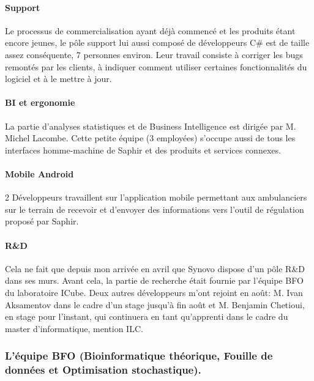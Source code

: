 \documentclass[french, 11pt]{memoir}
\begin{document}
\paragraph{Support}\label{support}

Le processus de commercialisation ayant déjà commencé et les produits
étant encore jeunes, le pôle support lui aussi composé de développeurs
C\# est de taille assez conséquente, 7 personnes environ. Leur travail
consiste à corriger les bugs remontés par les clients, à indiquer
comment utiliser certaines fonctionnalités du logiciel et à le mettre à
jour.

\paragraph{BI et ergonomie}\label{bi-et-ergonomie}

La partie d'analyses statistiques et de Business Intelligence est
dirigée par M. Michel Lacombe. Cette petite équipe (3 employées)
s'occupe aussi de tous les interfaces homme-machine de Saphir et des
produits et services connexes.

\paragraph{Mobile Android}\label{mobile-android}

2 Développeurs travaillent sur l'application mobile permettant aux
ambulanciers sur le terrain de recevoir et d'envoyer des informations
vers l'outil de régulation proposé par Saphir.

\paragraph{R\&D}\label{rd}

Cela ne fait que depuis mon arrivée en avril que Synovo dispose d'un
pôle R\&D dans ses murs. Avant cela, la partie de recherche était
fournie par l'équipe BFO du laboratoire ICube. Deux autres développeurs
m'ont rejoint en août: M. Ivan Aksamentov dans le cadre d'un stage
jusqu'à fin août et M. Benjamin Chetioui, en stage pour l'instant, qui
continuera en tant qu'apprenti dans le cadre du master d'informatique,
mention ILC.

\subsubsection{L'équipe BFO (Bioinformatique théorique, Fouille de
données et Optimisation
stochastique).}\label{luxe9quipe-bfo-bioinformatique-thuxe9orique-fouille-de-donnuxe9es-et-optimisation-stochastique.}
\end{document}
